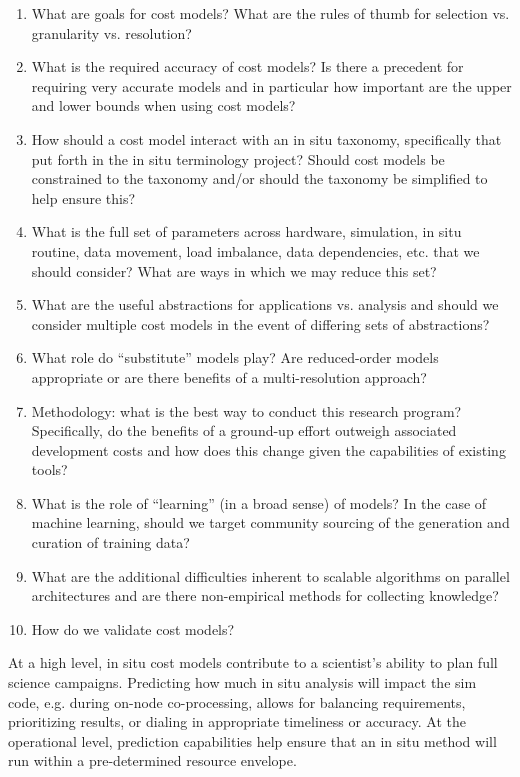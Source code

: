 \begin{refsection}
\begin{enumerate}
    \item What are goals for cost models? What are the rules of thumb for selection vs. granularity vs. resolution?
    \item What is the required accuracy of cost models?  Is there a precedent for requiring very accurate models and in particular how important are the upper and lower bounds when using cost models?
    \item How should a cost model interact with an in situ taxonomy, specifically that put forth in the in situ terminology project?  Should cost models be constrained to the taxonomy and/or should the taxonomy be simplified to help ensure this?
    \item What is the full set of parameters across hardware, simulation, in situ routine, data movement, load imbalance, data dependencies, etc. that we should consider?  What are ways in which we may reduce this set?
    \item What are the useful abstractions for applications vs. analysis and should we consider multiple cost models in the event of differing sets of abstractions?
    \item What role do “substitute” models play?  Are reduced-order models appropriate or are there benefits of a multi-resolution approach?
    \item Methodology: what is the best way to conduct this research program?  Specifically, do the benefits of a ground-up effort outweigh associated development costs and how does this change given the capabilities of existing tools?
    \item What is the role of “learning” (in a broad sense) of models?  In the case of machine learning, should we target community sourcing of the generation and curation of training data?
    \item What are the additional difficulties inherent to scalable algorithms on parallel architectures and are there non-empirical methods for collecting knowledge?
    \item How do we validate cost models?
\end{enumerate}

\noindent
At a high level, in situ cost models contribute to a scientist’s ability to plan full science campaigns.  
Predicting how much in situ analysis will impact the sim code, e.g. during on-node co-processing, allows for balancing requirements, prioritizing results, or dialing in appropriate timeliness or accuracy.  
At the operational level, prediction capabilities help ensure that an in situ method will run within a pre-determined resource envelope.

\printbibliography
\end{refsection}


